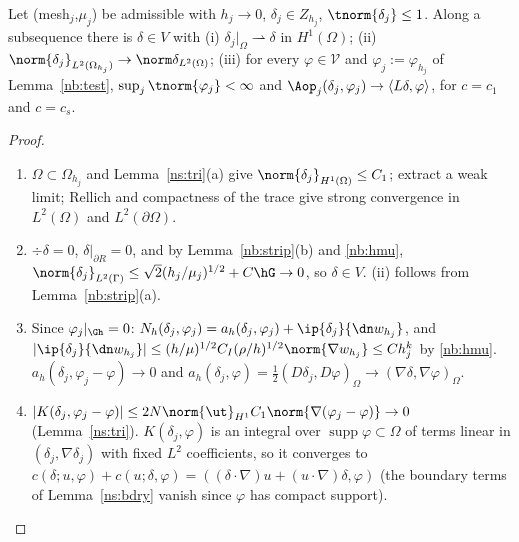 \begin{lemma}\label{nb:limit}
Let (mesh$_j$,$\mu_j$) be admissible with $h_j\to0$, $\delta_j\in Z_{h_j}$, $\tnorm{\delta_j}\le1$. Along a subsequence there is $\delta\in V$ with
(i) $\delta_j|_\Omega\rightharpoonup\delta$ in $H^1(\Omega)$; (ii) $\norm{\delta_j}_{L^2(\Omega_{h_j})}\to\norm\delta_{L^2(\Omega)}$; (iii) for every $\varphi\in\mathcal V$ and $\varphi_j:=\varphi_{h_j}$ of Lemma~\ref{nb:test},
$\sup_j\tnorm{\varphi_j}<\infty$ and $\Aop_j(\delta_j,\varphi_j)\to\langle L\delta,\varphi\rangle$, for $c=c_1$ and $c=c_s$.
\end{lemma}
\begin{proof}
\begin{enumerate}
\item $\Omega\subset\Omega_{h_j}$ and Lemma~\ref{ns:tri}(a) give $\norm{\delta_j}_{H^1(\Omega)}\le C_1$; extract a weak limit; Rellich and compactness of the trace give strong convergence in $L^2(\Omega)$ and $L^2(\partial\Omega)$.
\item $\div\delta=0$, $\delta|_{\partial R}=0$, and by Lemma~\ref{nb:strip}(b) and \eqref{nb:hmu}, $\norm{\delta_j}_{L^2(\Gamma)}\le\sqrt2(h_j/\mu_j)^{1/2}+C\hG\to0$, so $\delta\in V$. (ii) follows from Lemma~\ref{nb:strip}(a).
\item Since $\varphi_j|_{\Gh}=0$: $N_h(\delta_j,\varphi_j)=a_h(\delta_j,\varphi_j)+\ip{\delta_j}{\dn w_{h_j}}$, and $|\ip{\delta_j}{\dn w_{h_j}}|\le(h/\mu)^{1/2}C_I(\rho/h)^{1/2}\norm{\nabla w_{h_j}}\le Ch_j^k$ by \eqref{nb:hmu}.
$a_h(\delta_j,\varphi_j-\varphi)\to0$ and $a_h(\delta_j,\varphi)=\frac12(D\delta_j,D\varphi)_\Omega\to(\nabla\delta,\nabla\varphi)_\Omega$.
\item $|K(\delta_j,\varphi_j-\varphi)|\le2N\norm{\ut}_{H^1}C_1\norm{\nabla(\varphi_j-\varphi)}\to0$ (Lemma~\ref{ns:tri}). $K(\delta_j,\varphi)$ is an integral over $\operatorname{supp}\varphi\subset\Omega$ of terms linear in
$(\delta_j,\nabla\delta_j)$ with fixed $L^2$ coefficients, so it converges to $c(\delta;u,\varphi)+c(u;\delta,\varphi)=((\delta\cdot\nabla)u+(u\cdot\nabla)\delta,\varphi)$ (the boundary terms of Lemma~\ref{ns:bdry} vanish since $\varphi$ has compact support).\qedhere
\end{enumerate}
\end{proof}

